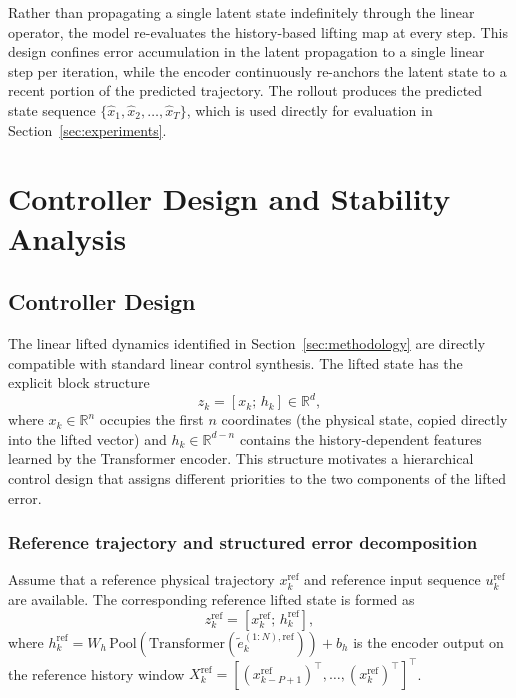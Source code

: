 \documentclass[journal]{IEEEtran}
\begin{document}
Rather than propagating a single latent state indefinitely through the linear operator, the model re-evaluates the history-based lifting map at every step. This design confines error accumulation in the latent propagation to a single linear step per iteration, while the encoder continuously re-anchors the latent state to a recent portion of the predicted trajectory. The rollout produces the predicted state sequence $\{\hat{x}_1,\hat{x}_2,\ldots,\hat{x}_T\}$, which is used directly for evaluation in Section~\ref{sec:experiments}.

\section{Controller Design and Stability Analysis}
\label{sec:control}

\subsection{Controller Design}
\label{subsec:controller_design}

The linear lifted dynamics identified in Section~\ref{sec:methodology} are directly compatible with standard linear control synthesis. The lifted state has the explicit block structure
\begin{equation}
    z_k = [x_k;\, h_k] \in \mathbb{R}^d,
    \label{eq:lifted_block}
\end{equation}
where $x_k \in \mathbb{R}^n$ occupies the first $n$ coordinates (the physical state, copied directly into the lifted vector) and $h_k \in \mathbb{R}^{d-n}$ contains the history-dependent features learned by the Transformer encoder. This structure motivates a hierarchical control design that assigns different priorities to the two components of the lifted error.

\subsubsection*{Reference trajectory and structured error decomposition}

Assume that a reference physical trajectory $x_k^{\mathrm{ref}}$ and reference input sequence $u_k^{\mathrm{ref}}$ are available. The corresponding reference lifted state is formed as
\begin{equation}
    z_k^{\mathrm{ref}} = [x_k^{\mathrm{ref}};\, h_k^{\mathrm{ref}}],
    \label{eq:ref_lifted}
\end{equation}
where $h_k^{\mathrm{ref}} = W_h\,\mathrm{Pool}\!\left(\mathrm{Transformer}(\tilde{e}^{(1:N),\mathrm{ref}}_k)\right) + b_h$ is the encoder output on the reference history window $X_k^{\mathrm{ref}} = [(x_{k-P+1}^{\mathrm{ref}})^\top,\ldots,(x_k^{\mathrm{ref}})^\top]^\top$.
\end{document}
